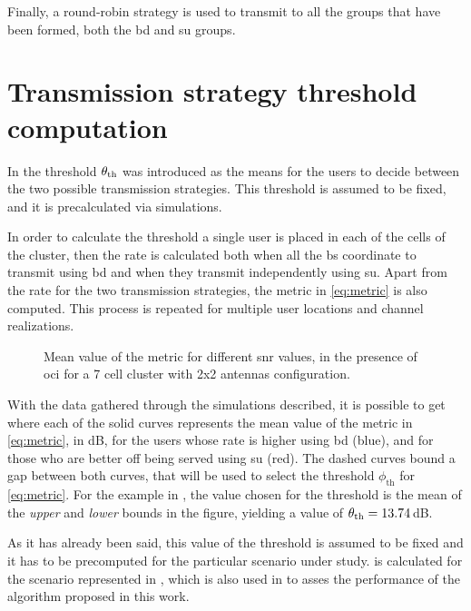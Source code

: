 Finally, a round-robin strategy is used to transmit to all the groups that have
been formed, both the \gls{bd} and \gls{su} groups.

\section{Transmission strategy threshold computation}
\label{ssec:sched_threshold}

In  the threshold $\theta_{\text{th}}$ was introduced as the
means for the users to decide between the two possible transmission strategies.
This threshold is assumed to be fixed, and it is precalculated via simulations.

In order to calculate the threshold a single user is placed in each of the cells
of the cluster, then the rate is calculated both when all the \gls{bs}
coordinate to transmit using \gls{bd} and when they transmit independently using
\gls{su}. Apart from the rate for the two transmission strategies, the metric in
\eqref{eq:metric} is also computed. This process is repeated for multiple user
locations and channel realizations.

\begin{figure}[t]
    \centering
    \begin{minipage}[t]{0.7\textwidth}
        
    \end{minipage}
    \caption{Mean value of the metric for different \gls{snr} values, in the
    presence of \gls{oci} for a 7 cell cluster with 2x2 antennas configuration.}
    \label{fig:threshold_2x2}
\end{figure}

With the data gathered through the simulations described, it is possible to get
 where each of the solid curves represents the mean
value of the metric in \eqref{eq:metric}, in dB, for the users whose rate is
higher using \gls{bd} (blue), and for those who are better off being served
using \gls{su} (red). The dashed curves bound a gap between both curves, that
will be used to select the threshold $\phi_{\text{th}}$ for \eqref{eq:metric}.
For the example in , the value chosen for the threshold
is the mean of the \emph{upper} and \emph{lower} bounds in the figure, yielding
a value of $\theta_{\text{th}} = 13.74$\,dB.

As it has already been said, this value of the threshold is assumed to be fixed
and it has to be precomputed for the particular scenario under study.
 is calculated for the scenario represented in
, which is also used in
 to asses the performance of the algorithm proposed
in this work.

